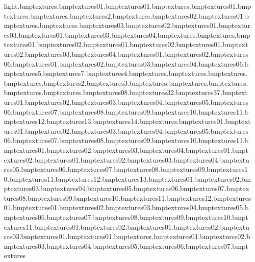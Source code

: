light.bmp textures\uplights.bmp textures\tyre01.bmp textures\truckwindow01.bmp textures\truckwheelarch.bmp textures\truckunderside01.bmp textures\trucktop.bmp textures\trucktiretred.bmp textures\trucktire2.bmp textures\trucktire.bmp textures\truckside02.bmp textures\truckside01.bmp textures\truckbonnet.bmp textures\truckback.bmp textures\trolleywheel03.bmp textures\trolleywheel02.bmp textures\trolleywheel01.bmp textures\trolleymesh03.bmp textures\anvil01.bmp textures\anvil03.bmp textures\anvil04.bmp textures\banner.bmp textures\barrier.bmp textures\barrier01.bmp textures\barrier02.bmp textures\barrierlight01.bmp textures\barrierlight02.bmp textures\barsblue01.bmp textures\barsblue02.bmp textures\barsblue03.bmp textures\barsblue04.bmp textures\bigcraneside01.bmp textures\bigcraneside02.bmp textures\bluhut06.bmp textures\box01.bmp textures\box02.bmp textures\box03.bmp textures\box04.bmp textures\box06.bmp textures\box5.bmp textures\box7.bmp textures\bridgesnow4.bmp textures\bushtex.bmp textures\car.bmp textures\carback.bmp textures\cardbox.bmp textures\cardbox2.bmp textures\cardbox3.bmp textures\carflap.bmp textures\carfront.bmp textures\carguard.bmp textures\carwin.bmp textures\ceilingtiles.bmp textures\ceramictile08.bmp textures\ceramictile32.bmp textures\ceramictile37.bmp textures\chblock01.bmp textures\chblock02.bmp textures\chblock03.bmp textures\chblock04.bmp textures\chblock05.bmp textures\chblock06.bmp textures\chblock07.bmp textures\chblock08.bmp textures\chblock09.bmp textures\chblock10.bmp textures\chblock11.bmp textures\chblock12.bmp textures\chblock13.bmp textures\chblock14.bmp textures\chrome.bmp textures\chubcarpark01.bmp textures\chubcons01.bmp textures\chubcons02.bmp textures\chubcons03.bmp textures\chubcons04.bmp textures\chubcons05.bmp textures\chubcons06.bmp textures\chubcons07.bmp textures\chubcons08.bmp textures\chubcons09.bmp textures\chubcons10.bmp textures\chubcons11.bmp textures\chubdept01.bmp textures\chubdept02.bmp textures\chubdept03.bmp textures\chubdept04.bmp textures\chubflannel01.bmp textures\chubflannel02.bmp textures\chubglad01.bmp textures\chubglad02.bmp textures\chubglad03.bmp textures\chubglad04.bmp textures\chubglad05.bmp textures\chubglad06.bmp textures\chubglad07.bmp textures\chubglad08.bmp textures\chubglad09.bmp textures\chubglad10.bmp textures\chubglad11.bmp textures\chubglad12.bmp textures\chubglad13.bmp textures\chubgreen01.bmp textures\chubgreen02.bmp textures\chubgreen03.bmp textures\chubgreen04.bmp textures\chubgreen05.bmp textures\chubgreen06.bmp textures\chubgreen07.bmp textures\chubgreen08.bmp textures\chubgreen09.bmp textures\chubgreen10.bmp textures\chubgreen11.bmp textures\chubgreen12.bmp textures\chubhole01.bmp textures\chubice01.bmp textures\chubice02.bmp textures\chubice03.bmp textures\chubice04.bmp textures\chubice05.bmp textures\chubice06.bmp textures\chubice07.bmp textures\chubice08.bmp textures\chubice09.bmp textures\chubice10.bmp textures\chubice11.bmp textures\chubmarv01.bmp textures\chubmarv02.bmp textures\chubmus01.bmp textures\chubmus02.bmp textures\chubmus03.bmp textures\chubneon01.bmp textures\chubpurple01.bmp textures\chubred.bmp textures\chubsafe01.bmp textures\chubsafe02.bmp textures\chubsafe03.bmp textures\chubsafe04.bmp textures\chubsafe05.bmp textures\chubsafe06.bmp textures\chubsafe07.bmp textures\chubs